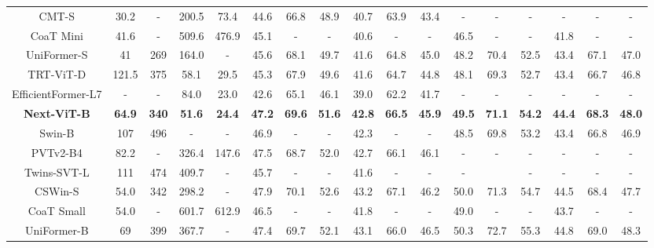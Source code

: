 \documentclass[10pt,twocolumn,letterpaper]{article}
\begin{document}
\begin{table*}[]
{\begin{tabular}{c|cc|cc|cccccc|cccccc}
    CMT-S\cite{CSWin}       & 30.2      & -    &200.5   &73.4     & 44.6          & 66.8          & 48.9          & 40.7          & 63.9         &43.4         & -          & -          & -          & -       & -          & -           \\
    CoaT Mini\cite{CoaT}       & 41.6      & -    &509.6   &476.9     &45.1          &-         & -          & 40.6          &-         & -          & 46.5         &-         & -           & 41.8         &-       & -        \\
    UniFormer-S\cite{uniformer}       & 41      & 269    &164.0   & -   &45.6   &68.1   &49.7   &41.6   &64.8   &45.0   &48.2   &70.4   &52.5   &43.4   &67.1   &47.0       \\
    TRT-ViT-D\cite{xia2022trt}       & 121.5      & 375    &58.1   & 29.5    &45.3   &67.9    &49.6  &41.6   &64.7   &44.8   &48.1   &69.3   &52.7   &43.4   &66.7   &46.8        \\
    EfficientFormer-L7\cite{li2022efficientformer}       & -      & -    & 84.0  & 23.0  & 42.6         & 65.1          & 46.1          & 39.0          & 62.2          & 41.7         & -          & - & -          & -       & -          & -           \\
    \textbf{Next-ViT-B}      &\textbf{64.9}   &\textbf{340}  &\textbf{51.6}   &\textbf{24.4}   &\textbf{47.2}   &\textbf{69.6}   &\textbf{51.6}   &\textbf{42.8}   &\textbf{66.5}   &\textbf{45.9}   &\textbf{49.5}   &\textbf{71.1}   &\textbf{54.2}   &\textbf{44.4}   &\textbf{68.3}  &\textbf{48.0}          \\

     \midrule
    Swin-B\cite{Swin}         & 107      & 496    & -  & -     & 46.9 & - & - & 42.3 & - & - & 48.5 & 69.8 & 53.2 & 43.4 & 66.8 & 46.9          \\
    PVTv2-B4\cite{PVT_v2}            & 82.2      & -    &326.4   & 147.6   & 47.5 &68.7 &52.0 &42.7 &66.1 &46.1          & -          & -          & -          & -          & -          & -          \\
    Twins-SVT-L\cite{Twins}    & 111      & 474   & 409.7  &   -   & 45.7          & -          & -          & 41.6          & -          & -          & -          &           & -          & -          & -          & -          \\
    CSWin-S\cite{CSWin}       & 54.0      & 342    &298.2   &-    & 47.9          & 70.1          & 52.6          & 43.2          & 67.1          & 46.2          & 50.0          & 71.3          & 54.7          & 44.5          & 68.4          & 47.7          \\
    CoaT Small\cite{CoaT}      & 54.0      & -    &601.7   &  612.9   & 46.5         &-         & -           & 41.8         &-         & -         & 49.0          &-         & -           &43.7         &-  & -        \\
    UniFormer-B\cite{uniformer}       & 69      & 399    & 367.7  & -  &47.4   &69.7   &52.1   &43.1   &66.0   &46.5   &50.3   &72.7   &55.3   &44.8   &69.0   &48.3        \\
    

\end{tabular}}
\end{table*}
\end{document}
